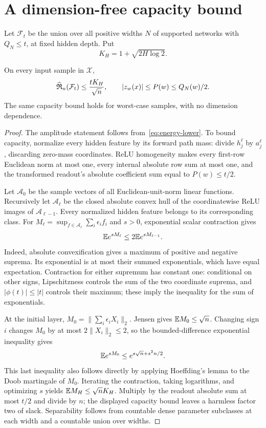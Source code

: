 \section{A dimension-free capacity bound}
Let $\mathcal F_t$ be the union over all positive widths $N$ of supported networks with $Q_N\le t$, at fixed hidden depth. Put
\[
 K_H=1+\sqrt{2H\log2}.
\]

\begin{lemma}
\label{lem:capacity}
On every input sample in $\mathcal X$,
\[
 \widehat{\mathfrak R}_n(\mathcal F_t)\le\frac{tK_H}{\sqrt n},\qquad
 |z_w(x)|\le P(w)\le Q_N(w)/2.
\]
The same capacity bound holds for worst-case samples, with no dimension dependence.
\end{lemma}
\begin{proof}
The amplitude statement follows from~\eqref{eq:energy-lower}. To bound capacity, normalize every hidden feature by its forward path mass: divide $h_j^\ell$ by $a_j^\ell$, discarding zero-mass coordinates. ReLU homogeneity makes every first-row Euclidean norm at most one, every internal absolute row sum at most one, and the transformed readout's absolute coefficient sum equal to $P(w)\le t/2$.

Let $\mathcal A_0$ be the sample vectors of all Euclidean-unit-norm linear functions. Recursively let $\mathcal A_\ell$ be the closed absolute convex hull of the coordinatewise ReLU images of $\mathcal A_{\ell-1}$. Every normalized hidden feature belongs to its corresponding class. For $M_\ell=\sup_{f\in\mathcal A_\ell}\sum_i\epsilon_if_i$ and $s>0$, exponential scalar contraction gives
\[
 \mathbb E e^{sM_\ell}\le2\mathbb E e^{sM_{\ell-1}}.
\]
Indeed, absolute convexification gives a maximum of positive and negative suprema. Its exponential is at most their summed exponentials, which have equal expectation. Contraction for either supremum has constant one: conditional on other signs, Lipschitzness controls the sum of the two coordinate suprema, and $|\phi(t)|\le|t|$ controls their maximum; these imply the inequality for the sum of exponentials.

At the initial layer, $M_0=\|\sum_i\epsilon_iX_i\|_2$. Jensen gives $\mathbb E M_0\le\sqrt n$. Changing sign $i$ changes $M_0$ by at most $2\|X_i\|_2\le2$, so the bounded-difference exponential inequality gives
\[
 \mathbb E e^{sM_0}\le e^{s\sqrt n+s^2n/2}.
\]
This last inequality also follows directly by applying Hoeffding's lemma to the Doob martingale of $M_0$. Iterating the contraction, taking logarithms, and optimizing $s$ yields $\mathbb E M_H\le\sqrt nK_H$. Multiply by the readout absolute sum at most $t/2$ and divide by $n$; the displayed capacity bound leaves a harmless factor two of slack. Separability follows from countable dense parameter subclasses at each width and a countable union over widths.
\end{proof}
